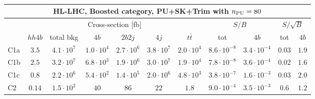   $\,$ \\
 \vspace{0.5cm}
 \begin{tabular}{|l|cc|cccc|cc|cc|}
  \hline
  \multicolumn{11}{|c|}{HL-LHC, Boosted category, PU+SK+Trim with $n_{\rm PU}=80$}\\
   \hline
&  \multicolumn{6}{c|}{Cross-section [fb]} &  \multicolumn{2}{c|}{$S/B$}  &  \multicolumn{2}{c|}{$S/\sqrt{B}$}  \\
   &  $hh4b$ &  total bkg  &   $4b$    &  $2b2j$   &   $4j$    &
$t\bar{t}$ &
tot & $4b$ & tot & $4b$ \\
  \hline
  \hline
 C1a     &  $3.5 $  &   $4.1 \cdot 10^7$   & $1.0 \cdot 10^4$   & $2.7 \cdot 10^6$ & $3.8 \cdot 10^7$         & $2.0 \cdot 10^4 $    &   $8.6 \cdot 10^{-8}$    & $3.4 \cdot 10^{-4}$  &   0.03    & $1.9 $ \\
 C1b     & $2.5 $   &   $3.2 \cdot 10^7$   & $6.8 \cdot 10^3$   & $1.9 \cdot 10^6$ & $3.0 \cdot 10^7$         & $1.9 \cdot 10^4  $   &   $7.8 \cdot 10^{-8}$    & $3.6 \cdot 10^{-4}$  &   0.02  & $1.6 $ \\
 C1c     & $0.8 $   &   $2.2 \cdot 10^6$   & $5.4 \cdot 10^2$   & $1.4 \cdot 10^5$ & $2.0 \cdot 10^6$         & $4.8 \cdot 10^3   $  &   $3.8 \cdot 10^{-7}$    & $1.6 \cdot 10^{-3}$  &   0.03      & $2.0 $ \\
 C2      & $0.14$   &   $1.5 \cdot 10^2$   & $40$               & $86$             & $22$                     & $1.8 $               &   $ 9.0 \cdot 10^{-4}$   & $3.5 \cdot 10^{-3}$  &  0.6                & $1.2 $ \\
\hline
\end{tabular}
 
